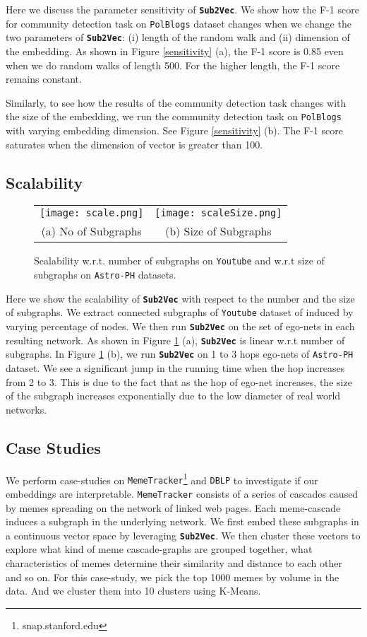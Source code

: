 \documentclass[sigconf]{acmart}
\newcommand{\alg}{{\bf {\tt Sub2Vec}}\xspace}
\newcommand{\dblp}{{\tt DBLP}\xspace}
\newcommand{\youtube}{{\tt Youtube}\xspace}
\newcommand{\polblogs}{{\tt PolBlogs}\xspace}
\newcommand{\arxiv}{{\tt Astro-PH}\xspace}
\newcommand{\memetracker}{{\tt MemeTracker}\xspace}
\begin{document}
Here we discuss the parameter sensitivity of \alg. We show how the F-1 score for community detection task on \polblogs dataset changes when we change the two parameters of \alg: (i) length of the random walk and (ii) dimension of the embedding. As shown in Figure \ref{sensitivity} (a), the F-1 score is 0.85 even when we do random walks of length 500. For the higher length,  the F-1 score remains constant. 

Similarly, to see how the results of the community detection task changes with the size of the embedding, we run the community detection task on \polblogs with varying embedding dimension. See  Figure  \ref{sensitivity} (b). The F-1 score saturates when the dimension of vector is greater than 100.


\subsection{Scalability}
\begin{figure}[ht]
\begin{center}
  \begin{tabular}{c|c}
  \texttt{[image: scale.png]} &
      \texttt{[image: scaleSize.png]}  \\
      (a) No of Subgraphs  & (b) Size of Subgraphs 
    \end{tabular}
    \vspace{-0.15in}
\caption{Scalability w.r.t. number of subgraphs on \youtube and w.r.t size of subgraphs on \arxiv datasets. }
\label{scalability}
\end{center}
\end{figure}

Here we show the scalability of \alg with respect to the number and the size of subgraphs. We extract connected subgraphs of \youtube dataset of induced by varying percentage of nodes. We then run \alg on the set of ego-nets in each resulting network. As shown in Figure \ref{scalability} (a), \alg is linear w.r.t number of subgraphs. 
In Figure \ref{scalability} (b), we run \alg on 1 to 3 hops ego-nets of \arxiv dataset. We see a significant jump in the running time when the hop increases from 2 to 3. This is due to the fact that as the hop of ego-net increases, the size of the subgraph increases exponentially due to the low diameter of real world networks.	

\subsection{Case Studies}
We perform case-studies on \memetracker\footnote{{snap.stanford.edu}}  and \dblp to investigate if our embeddings are interpretable. \memetracker consists of a series of cascades caused by memes spreading on the network of linked web pages. Each meme-cascade induces a subgraph in the underlying network. We first embed these subgraphs in a continuous vector space by leveraging \alg. We then cluster these vectors to explore what kind of meme cascade-graphs are grouped together, what characteristics of memes determine their similarity and distance to each other and so on. For this case-study, we pick the top 1000 memes by volume in the data. And we cluster them into 10 clusters using K-Means.
\end{document}
